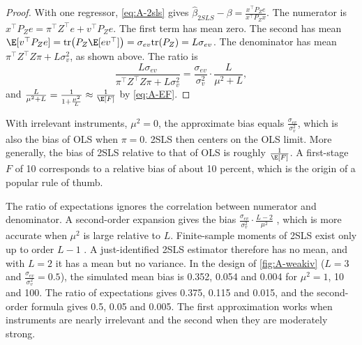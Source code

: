 \begin{proof}
With one regressor, \eqref{eq:A-2sls} gives $\hat\beta_{2SLS} - \beta = \frac{x^\top P_Ze}{x^\top P_Zx}$. The numerator is
$x^\top P_Ze = \pi^\top Z^\top e + v^\top P_Ze$. The first term has mean zero. The second has mean
$\E[v^\top P_Ze] = \mathrm{tr}\bigl(P_Z\E[ev^\top]\bigr) = \sigma_{ev}\mathrm{tr}(P_Z) = L\sigma_{ev}$. The denominator
has mean $\pi^\top Z^\top Z\pi + L\sigma_v^2$, as shown above. The ratio is
\begin{equation*}
\frac{L\sigma_{ev}}{\pi^\top Z^\top Z\pi + L\sigma_v^2} = \frac{\sigma_{ev}}{\sigma_v^2}\cdot\frac{L}{\mu^2 + L} ,
\end{equation*}
and $\frac{L}{\mu^2 + L} = \frac{1}{1 + \frac{\mu^2}{L}} \approx \frac{1}{\E[F]}$ by \eqref{eq:A-EF}.
\end{proof}

With irrelevant instruments, $\mu^2 = 0$, the approximate bias equals $\frac{\sigma_{ev}}{\sigma_v^2}$, which is
also the bias of OLS when $\pi = 0$. 2SLS then centers on the OLS limit. More generally, the bias of 2SLS
relative to that of OLS is roughly $\frac{1}{\E[F]}$. A first-stage $F$ of 10 corresponds to a relative bias
of about 10 percent, which is the origin of a popular rule of thumb.

\begin{remark}\label{rem:A-nagar}
The ratio of expectations ignores the correlation between numerator and denominator. A second-order
expansion gives the bias $\frac{\sigma_{ev}}{\sigma_v^2}\cdot\frac{L - 2}{\mu^2}$ \citep{Nagar1959}, which is more
accurate when $\mu^2$ is large relative to $L$. Finite-sample moments of 2SLS exist only up to order $L - 1$
\citep{Kinal1980}. A just-identified 2SLS estimator therefore has no mean, and with $L = 2$ it has a mean but no
variance. In the design of \cref{fig:A-weakiv} ($L = 3$ and $\frac{\sigma_{ev}}{\sigma_v^2} = 0.5$), the simulated mean
bias is 0.352, 0.054 and 0.004 for $\mu^2 = 1$, 10 and 100. The ratio of expectations gives 0.375, 0.115 and
0.015, and the second-order formula gives 0.5, 0.05 and 0.005. The first approximation works when instruments
are nearly irrelevant and the second when they are moderately strong.
\end{remark}

